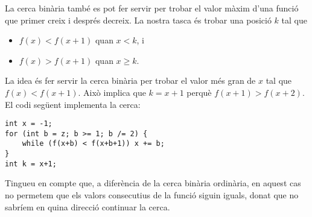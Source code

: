 La cerca binària també es pot fer servir per trobar
el valor màxim d'una funció que primer creix i després
decreix.
La nostra tasca és trobar una posició $k$ tal que

\begin{itemize}
\item
$f(x)<f(x+1)$ quan $x<k$, i
\item
$f(x)>f(x+1)$ quan $x \ge k$.
\end{itemize}

La idea és fer servir la cerca binària
per trobar el valor més gran de $x$
tal que $f(x)<f(x+1)$.
Això implica que $k=x+1$
perquè $f(x+1)>f(x+2)$.
El codi següent implementa la cerca:

\begin{lstlisting}
int x = -1;
for (int b = z; b >= 1; b /= 2) {
    while (f(x+b) < f(x+b+1)) x += b;
}
int k = x+1;
\end{lstlisting}

Tingueu en compte que, a diferència de la cerca binària ordinària,
en aquest cas no permetem que els valors consecutius
de la funció siguin iguals, donat que no sabríem
en quina direcció continuar la cerca.
